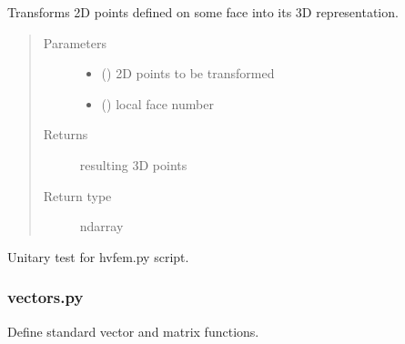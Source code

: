 \documentclass[letterpaper,10pt,english]{sphinxmanual}
\begin{document}
\begin{fulllineitems}
\label{\detokenize{petgem/hvfem:petgem.hvfem.transform2Dto3DInReferenceElement}}
Transforms 2D points defined on some face into its 3D representation.
\begin{quote}\begin{description}
\item[{Parameters}] \leavevmode\begin{itemize}
\item {} 
 () \textendash{} 2D points to be transformed

\item {} 
 () \textendash{} local face number

\end{itemize}

\item[{Returns}] \leavevmode
resulting 3D points

\item[{Return type}] \leavevmode
ndarray

\end{description}\end{quote}

\end{fulllineitems}


\begin{fulllineitems}
\label{\detokenize{petgem/hvfem:petgem.hvfem.unitary_test}}
Unitary test for hvfem.py script.

\end{fulllineitems}



\subsubsection{vectors.py}
\label{\detokenize{petgem/vectors:module-petgem.vectors}}\label{\detokenize{petgem/vectors:vectors-py}}\label{\detokenize{petgem/vectors::doc}}
Define standard vector and matrix functions.
\end{document}
